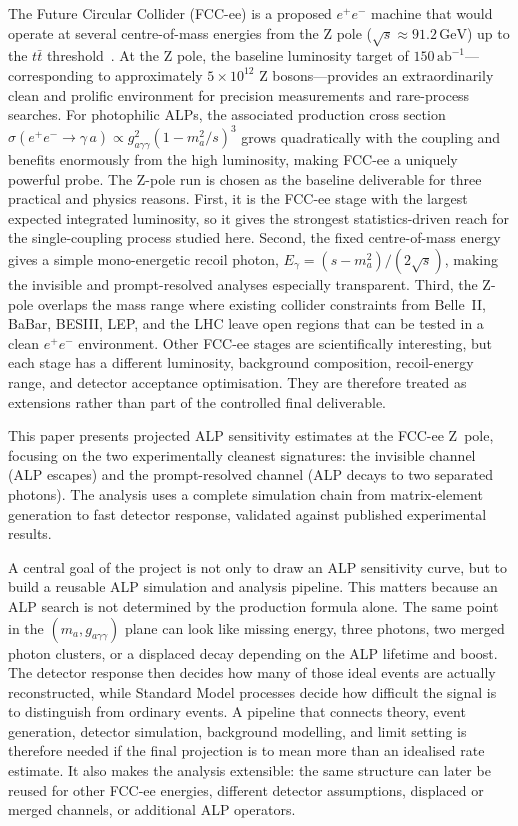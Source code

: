 \documentclass[12pt,a4paper]{article}
\newcommand{\alp}{a}
\newcommand{\gagg}{g_{a\gamma\gamma}}
\newcommand{\ma}{m_a}
\newcommand{\sqrts}{\sqrt{s}}
\newcommand{\GeV}{\,\text{GeV}}
\newcommand{\abinv}{\,\text{ab}^{-1}}
\begin{document}
The Future Circular Collider (FCC-ee) is a proposed $e^+e^-$ machine
that would operate at several centre-of-mass energies from the Z pole
($\sqrts \approx 91.2\GeV$) up to the $t\bar{t}$ threshold~\cite{FCCee_CDR,FCC_Physics}.
At the Z pole, the baseline luminosity target of $150\abinv$---corresponding
to approximately $5\times10^{12}$ Z bosons---provides an extraordinarily
clean and prolific environment for precision measurements and rare-process
searches.
For photophilic ALPs, the associated production cross section
$\sigma(e^+e^-\to\gamma\,\alp) \propto \gagg^2(1-\ma^2/s)^3$ grows quadratically with the
coupling and benefits enormously from the high luminosity, making FCC-ee a
uniquely powerful probe.
The Z-pole run is chosen as the baseline deliverable for three practical and
physics reasons. First, it is the FCC-ee stage with the largest expected
integrated luminosity, so it gives the strongest statistics-driven reach for
the single-coupling process studied here. Second, the fixed centre-of-mass
energy gives a simple mono-energetic recoil photon,
$E_\gamma=(s-\ma^2)/(2\sqrts)$, making the invisible and prompt-resolved
analyses especially transparent. Third, the Z-pole overlaps the mass range
where existing collider constraints from Belle~II, BaBar, BESIII, LEP, and the
LHC leave open regions that can be tested in a clean $e^+e^-$ environment.
Other FCC-ee stages are scientifically interesting, but each stage has a
different luminosity, background composition, recoil-energy range, and
detector acceptance optimisation. They are therefore treated as extensions
rather than part of the controlled final deliverable.

This paper presents projected ALP sensitivity estimates at the FCC-ee
Z~pole, focusing on the two experimentally cleanest signatures: the
invisible channel (ALP escapes) and the prompt-resolved channel (ALP decays
to two separated photons).
The analysis uses a complete simulation chain from matrix-element
generation to fast detector response, validated against published experimental
results.

A central goal of the project is not only to draw an ALP sensitivity curve,
but to build a reusable ALP simulation and analysis pipeline.
This matters because an ALP search is not determined by the production formula
alone. The same point in the $(m_a,\gagg)$ plane can look like missing energy,
three photons, two merged photon clusters, or a displaced decay depending on
the ALP lifetime and boost. The detector response then decides how many of
those ideal events are actually reconstructed, while Standard Model processes
decide how difficult the signal is to distinguish from ordinary events.
A pipeline that connects theory, event generation, detector simulation,
background modelling, and limit setting is therefore needed if the final
projection is to mean more than an idealised rate estimate. It also makes the
analysis extensible: the same structure can later be reused for other FCC-ee
energies, different detector assumptions, displaced or merged channels, or
additional ALP operators.
\end{document}
